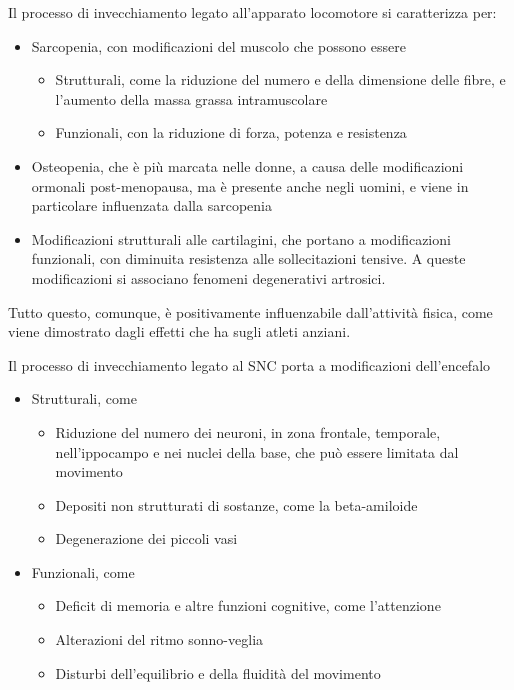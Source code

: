 Il processo di invecchiamento legato all'apparato locomotore si caratterizza 
per:
\begin{itemize}
 \item Sarcopenia, con modificazioni del muscolo che possono essere
 \begin{itemize}
  \item Strutturali, come la riduzione del numero e della dimensione delle 
fibre, e l'aumento della massa grassa intramuscolare
  \item Funzionali, con la riduzione di forza, potenza e resistenza
 \end{itemize}
 \item Osteopenia, che è più marcata nelle donne, a causa delle modificazioni 
ormonali post-menopausa, ma è presente anche negli uomini, e viene in 
particolare influenzata dalla sarcopenia
 \item Modificazioni strutturali alle cartilagini, che portano a modificazioni 
funzionali, con diminuita resistenza alle sollecitazioni tensive. A queste 
modificazioni si associano fenomeni degenerativi artrosici.
\end{itemize}

Tutto questo, comunque, è positivamente influenzabile dall'attività fisica, 
come viene dimostrato dagli effetti che ha sugli atleti anziani.

Il processo di invecchiamento legato al SNC porta a modificazioni dell'encefalo
\begin{itemize}
\item Strutturali, come
\begin{itemize}
 \item Riduzione del numero dei neuroni, in zona frontale, temporale, 
nell'ippocampo e nei nuclei della base, che può essere limitata dal movimento
 \item Depositi non strutturati di sostanze, come la beta-amiloide
 \item Degenerazione dei piccoli vasi
\end{itemize}
\item Funzionali, come 
\begin{itemize}
\item Deficit di memoria e altre funzioni cognitive, come l'attenzione
\item Alterazioni del ritmo sonno-veglia
\item Disturbi dell'equilibrio e della fluidità del movimento
\end{itemize}
\end{itemize}

